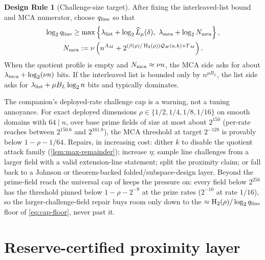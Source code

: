 \documentclass[11pt]{article}
\theoremstyle{definition}
\newtheorem{designrule}[theorem]{Design Rule}
\newcommand{\Hbin}{\operatorname{H}_2}
\newcommand{\Qprof}{\mathcal Q}
\newcommand{\qline}{q_{\rm line}}
\begin{document}
\begin{designrule}[Challenge-size target]
\label{rule:qchal}
After fixing the interleaved-list bound and MCA numerator, choose $\qline$ so that
\begin{gather*}
        \log_2\qline
        \ge
        \max\left\{
        \lambda_{\rm list}+\log_2\widehat L_{\mu}(\delta),\
        \lambda_{\rm mca}+\log_2 N_{\rm mca}
        \right\},\\
        N_{\rm mca}:=\nu\left(n^{A_M}
        +2^{(\beta(\rho)/\Hbin(\rho))\Qprof_H(a,k)+\Gamma_M}\right).
\end{gather*}
When the quotient profile is empty and $N_{\rm mca}\approx\nu n$, the MCA side asks for about $\lambda_{\rm mca}+\log_2(\nu n)$ bits.  If the interleaved list is bounded only by $n^{\mu B_L}$, the list side asks for $\lambda_{\rm list}+\mu B_L\log_2n$ bits and typically dominates.
\end{designrule}

The companion's deployed-rate challenge cap \cite[Prop.~19.7]{SlackMCAEntropyMerged} is a warning, not a tuning annoyance.  For exact deployed dimensions $\rho\in\{1/2,1/4,1/8,1/16\}$ on smooth domains with $64\mid n$, over base prime fields of size at most about $2^{150}$ (per-rate reaches between $2^{150.6}$ and $2^{161.8}$), the MCA threshold at target $2^{-128}$ is provably below $1-\rho-1/64$.  Repairs, in increasing cost: dither $k$ to disable the quotient attack family (\cref{lem:max-remainder}); increase $\eta$; sample line challenges from a larger field with a valid extension-line statement; split the proximity claim; or fall back to a Johnson or theorem-backed folded/subspace-design layer.  Beyond the prime-field reach the universal cap of \cite{UniversalCap} keeps the pressure on: every field below $2^{256}$ has the threshold pinned below $1-\rho-2^{-9}$ at the prize rates ($2^{-10}$ at rate $1/16$), so the larger-challenge-field repair buys room only down to the $\approx\Hbin(\rho)/\log_2\qline$ floor of \eqref{eq:cap-floor}, never past it.

\section{Reserve-certified proximity layer}
\label{sec:construction}
\end{document}
